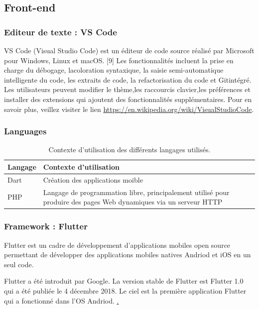 \subsection{Front-end}
\subsubsection{Editeur de texte : VS Code}
VS Code (Visual Studio Code) est un éditeur de code source réalisé par Microsoft pour Windows, Linux et macOS. [9] Les fonctionnalités incluent la prise en charge du débogage, lacoloration syntaxique, la saisie semi-automatique intelligente du code, les extraits de code, la refactorisation du code et Gitintégré. Les utilisateurs peuvent modifier le thème,les raccourcis clavier,les préférences et installer des extensions qui ajoutent des fonctionnalités supplémentaires. Pour en savoir plus, veillez visiter le lien \href{https://en.wikipedia.org/wiki/Visual_Studio_Code}{https://en.wikipedia.org/wiki/VisualStudioCode}.
\subsubsection{Languages}
\begin{table}[h]
	\begin{tabular}{|m{6cm}|m{10cm}|}
		\hline
		\textbf{Langage} & \textbf{Contexte d’utilisation} \\
		\hline
		Dart & Création des applications moible\\
		\hline
		PHP  & Langage de programmation libre, principalement utilisé pour produire des pages Web dynamiques via un serveur HTTP\\
		\hline
		
	\end{tabular}
	\caption{Contexte d’utilisation des différents langages utilisés.}
\end{table}
\subsubsection{Framework : Flutter}
\label{Flutter}
Flutter est un cadre de développement d’applications mobiles open source permettant de développer des applications mobiles natives Andriod et iOS en un seul code.

Flutter a été introduit par Google. La version stable de Flutter est Flutter 1.0 qui a été publiée le 4 décembre 2018. Le ciel est la première application Flutter qui a fonctionné dans l’OS Andriod. \href{https://www.claudebueno.com/technologies/introduction-a-flutter.htm}.
